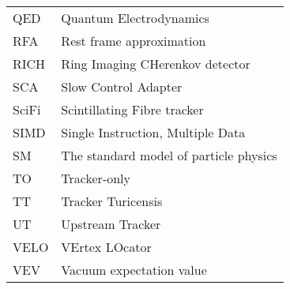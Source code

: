 \begin{supertabular}{ll}
    QED     & Quantum Electrodynamics \\
    RFA     & Rest frame approximation \\
    RICH    & Ring Imaging CHerenkov detector \\
    SCA     & Slow Control Adapter \\
    SciFi   & Scintillating Fibre tracker \\
    SIMD    & Single Instruction, Multiple Data \\
    SM      & The standard model of particle physics \\
    TO      & Tracker-only \\
    TT      & Tracker Turicensis \\
    UT      & Upstream Tracker \\
    VELO    & VErtex LOcator \\
    VEV     & Vacuum expectation value \\
\end{supertabular}
